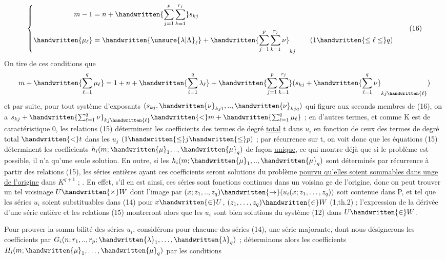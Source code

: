 
\[
\left\{\begin{aligned}
m-1&=n+\handwritten{\sum_{j=1}^p\sum_{k=1}^{r_j}}s_{kj}\\
\handwritten{\mu_\ell}&=\handwritten{\unsure{\lambda|\Lambda}_\ell}+\handwritten{\sum_{j=1}^p\sum_{k=1}^{r_j}\nu}_{kj}\qquad(1\handwritten{\leq\ell\leq}q)
\end{aligned}\right.\tag*{(16)}
\]
On tire de ces conditions que
\[
m+\handwritten{\sum_{\ell=1}^q\mu_\ell}=1+n+\handwritten{\sum_{\ell=1}^q\lambda_\ell}+\handwritten{\sum_{j=1}^p\sum_{k=1}^{r_j}}(s_{kj}+\handwritten{\sum_{\ell=1}^q\nu}_{kj\handwritten{\ell}})
\]
et par suite, pour tout système d'exposants $(s_{kj},\handwritten{\nu}_{kj1},..,\handwritten{\nu}_{kjq})$ qui figure aux seconds membres de (16), on a $s_{kj}+\handwritten{\sum_{\ell=1}^q\nu}_{kj\handwritten{\ell}}\handwritten{<}m+\handwritten{\sum_{\ell=1}^q\mu_\ell}$ ; en d'autres termes, et comme K est de caractéristique 0, les relations (15) déterminent les coefficients des termes de degré \uline{total} t dans $u_i$ en fonction de ceux des termes de degré total $\handwritten{<}t$ dans les $u_j$ $(1\handwritten{\leq}j\handwritten{\leq}p)$ ; par récurrence sur t, on voit donc que les équations (15) déterminent les coefficients $h_i(m;\handwritten{\mu}_1,..,\handwritten{\mu}_q)$ de fa\handwritten{-}çon \uline{unique}, ce qui montre déjà que si le problème est possible, il n'a qu'une seule solution. En outre, si les $h_i(m;\handwritten{\mu}_1,..,\handwritten{\mu}_q)$ sont déterminés par récurrence à partir des relations (15), les séries entières ayant ces coefficients seront solutions du problème \uline{pourvu qu'elles soient sommables dans un\handwritten{-}ge de l'origine} dans $K^{q+1}$ ; . En effet, s'il en est ainsi, ces séries sont fonctions continues dans un voisina ge de l'origine, donc on peut trouver un tel voisinage $U\handwritten{\times}W$ dont l'image par $(x;z_1,..,z_q)\handwritten{\to}(u_i(x;z_1,\ldots,z_q))$ soit contenue dans P, et tel que les séries $u_i$ soient substituables dans (14) pour $x\handwritten{\in}U$, $(z_1,\ldots,z_q)\handwritten{\in}W$ (\handwritten{\S}1,th.2) ; l'expression de la dérivée d'une série entière et les relations (15) montreront alors que les $u_i$ sont bien solutions du système (12) dans $U\handwritten{\in}W$.

Pour prouver la somm bilité des séries $u_i$, considérons pour chacune des séries (14), une série majorante, dont nous désignerons les coefficients par $G_i(n;r_1,..,r_p;\handwritten{\lambda}_1,\ldots,\handwritten{\lambda}_q)$ ; déterminons alors les coefficients $H_i(m;\handwritten{\mu}_1,\ldots,\handwritten{\mu}_q)$ par les conditions
